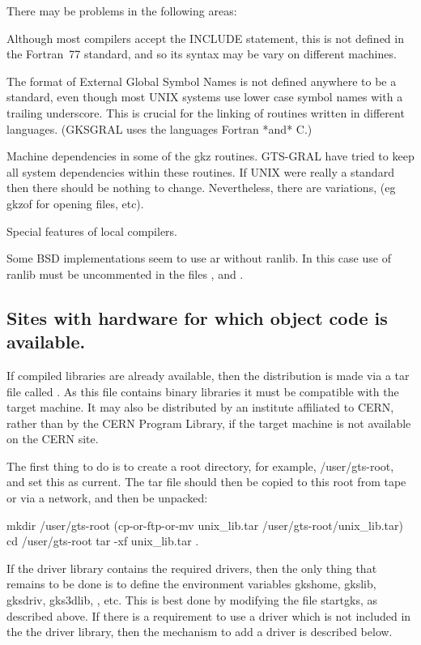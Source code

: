 There may be problems in the following areas:
\begin{OL}
\item Although most compilers accept the INCLUDE statement, this is not
defined in the Fortran~77
standard, and so its syntax may be vary on different machines.
\item The format of External Global Symbol Names is not defined anywhere
to be a standard, even though most UNIX systems use lower case symbol names
with a trailing underscore. This is crucial for the linking of routines
written in different languages. (GKSGRAL uses the languages Fortran *and* C.)
\item Machine dependencies in some of the gkz routines. GTS-GRAL have
tried to keep all system dependencies within these routines.
If UNIX were really a standard then there should be
nothing to change. Nevertheless, there are variations,
(eg gkzof for opening files, etc).
\item Special features of local compilers.
\item Some BSD implementations seem to use ar without ranlib.
In this case use of ranlib must be uncommented in the files ,
 and .
\end{OL}
\subsection{\protect\label{sec:objcode}Sites with hardware for which object code is available.}
 
If compiled libraries are already available,
then the distribution is made via a tar file called .
As this file contains binary libraries
it must be compatible with the target machine.
It may also be distributed by an institute affiliated to CERN,
rather than by the CERN Program Library, if the target machine
is not available on the CERN site.
 
The first thing to do is to create a root directory,
for example, /user/gts-root, and set this as current.
The tar file should then be copied to this root from
tape or via a network, and then be unpacked:

\begin{XMP} 
mkdir /user/gts-root
(cp-or-ftp-or-mv  unix_lib.tar /user/gts-root/unix_lib.tar)
cd    /user/gts-root
tar   -xf unix_lib.tar .
\end{XMP}
 
If the driver library contains the required drivers, then the only
thing that remains to be done is to define the environment variables
gkshome, gkslib, gksdriv, gks3dlib, , etc.
This is best done by modifying the file startgks, as described above.
If there is a requirement to use a driver which is not included
in the the driver library, then the mechanism to add a driver
is described below.

